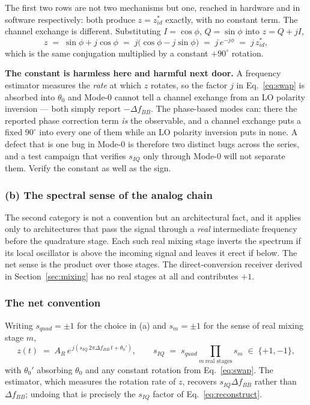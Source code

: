 \documentclass[11pt,a4paper]{article}
\begin{document}
The first two rows are not two mechanisms but one, reached in hardware and in software
respectively: both produce $z = z_{id}^{*}$ exactly, with no constant term. The channel exchange is
different. Substituting $I=\cos\phi$, $Q=\sin\phi$ into $z = Q + jI$,
\begin{equation}
z \;=\; \sin\phi + j\cos\phi \;=\; j\bigl(\cos\phi - j\sin\phi\bigr) \;=\; j\,e^{-j\phi}
  \;=\; j\,z_{id}^{*} ,
\label{eq:swap}
\end{equation}
which is the same conjugation multiplied by a constant $+90^{\circ}$ rotation.

\begin{callout}
\textbf{The constant is harmless here and harmful next door.} A frequency estimator measures the
\emph{rate} at which $z$ rotates, so the factor $j$ in Eq.~\eqref{eq:swap} is absorbed into
$\theta_0$ and Mode-0 cannot tell a channel exchange from an LO polarity inversion --- both simply
report $-\Delta f_{BB}$. The phase-based modes can: there the reported phase correction term
\emph{is} the observable, and a channel exchange puts a fixed $90^{\circ}$ into every one of them
while an LO polarity inversion puts in none. A defect that is one bug in Mode-0 is therefore two
distinct bugs across the series, and a test campaign that verifies $s_{IQ}$ only through Mode-0 will
not separate them. Verify the constant as well as the sign.
\end{callout}

\subsubsection*{(b) The spectral sense of the analog chain}

The second category is not a convention but an architectural fact, and it applies only to
architectures that pass the signal through a \emph{real} intermediate frequency before the quadrature
stage. Each such real mixing stage inverts the spectrum if its local oscillator is above the incoming
signal and leaves it erect if below. The net sense is the product over those stages. The
direct-conversion receiver derived in Section~\ref{sec:mixing} has no real stages at all and
contributes $+1$.

\subsubsection*{The net convention}

Writing $s_{quad} = \pm1$ for the choice in (a) and $s_{m} = \pm1$ for the sense of real mixing stage
$m$,
\begin{equation}
z(t) \;=\; A_R\, e^{\,j\left(s_{IQ}\,2\pi \Delta f_{BB}\, t + \theta_0'\right)},
\qquad
s_{IQ} \;=\; s_{quad}\prod_{m\ \text{real stages}} s_{m} \;\in\; \{+1,-1\},
\label{eq:siqdef}
\end{equation}
with $\theta_0'$ absorbing $\theta_0$ and any constant rotation from Eq.~\eqref{eq:swap}. The
estimator, which measures the rotation rate of $z$, recovers $s_{IQ}\Delta f_{BB}$ rather than
$\Delta f_{BB}$; undoing that is precisely the $s_{IQ}$ factor of Eq.~\eqref{eq:reconstruct}.
\end{document}
